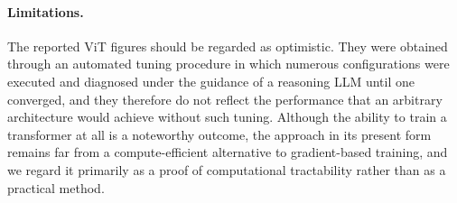 \paragraph{Limitations.} 
The reported ViT figures should be regarded as optimistic. They were obtained through
an automated tuning procedure in which numerous configurations were executed and
diagnosed under the guidance of a reasoning LLM until one converged, and they
therefore do not reflect the performance that an arbitrary architecture would achieve without such tuning. Although the ability to train a
transformer at all is a noteworthy outcome, the approach in its present form
remains far from a compute-efficient alternative to gradient-based training, and
we regard it primarily as a proof of computational tractability rather than as a practical method.